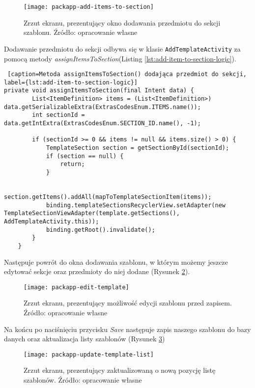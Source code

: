 \documentclass[a4paper,12pt]{article}
\begin{document}
\begin{figure}[H]
    \centering
    \texttt{[image: packapp-add-items-to-section]}
    \caption{Zrzut ekranu, prezentujący okno dodawania przedmiotu do sekcji szablonu. Źródło: opracowanie własne}
    \label{fig:packapp-add-items-to-section}
\end{figure}

Dodawanie przedmiotu do sekcji odbywa się w klasie \texttt{AddTemplateActivity} za pomocą metody \textit{assignItemsToSection}(Listing \ref{lst:add-item-to-section-logic}).

\begin{lstlisting} [caption=Metoda assignItemsToSection() dodająca przedmiot do sekcji, label={lst:add-item-to-section-logic}]
private void assignItemsToSection(final Intent data) {
        List<ItemDefinition> items = (List<ItemDefinition>) data.getSerializableExtra(ExtrasCodesEnum.ITEMS.name());
        int sectionId = data.getIntExtra(ExtrasCodesEnum.SECTION_ID.name(), -1);

        if (sectionId >= 0 && items != null && items.size() > 0) {
            TemplateSection section = getSectionById(sectionId);
            if (section == null) {
                return;
            }

            section.getItems().addAll(mapToTemplateSectionItem(items));
            binding.templateSectionsRecyclerView.setAdapter(new TemplateSectionViewAdapter(template.getSections(), AddTemplateActivity.this));
            binding.getRoot().invalidate();
        }
    }
\end{lstlisting}



Następuje powrót do okna dodawania szablonu, w którym możemy jeszcze edytować sekcje oraz przedmioty do niej dodane (Rysunek \ref{fig:packapp-edit-template}).

\begin{figure}[H]
    \centering
    \texttt{[image: packapp-edit-template]}
    \caption{Zrzut ekranu, prezentujący możliwość edycji szablonu przed zapisem. Źródło: opracowanie własne}
    \label{fig:packapp-edit-template}
\end{figure}

Na końcu po naciśnięciu przycisku \textit{Save} następuje zapis naszego szablonu do bazy danych oraz aktualizacja listy szablonów (Rysunek \ref{fig:packapp-update-template-list})

\begin{figure}[H]
    \centering
    \texttt{[image: packapp-update-template-list]}
    \caption{Zrzut ekranu, prezentujący zaktualizowaną o nową pozycję listę szablonów. Źródło: opracowanie własne}
    \label{fig:packapp-update-template-list}
\end{figure}
\end{document}
